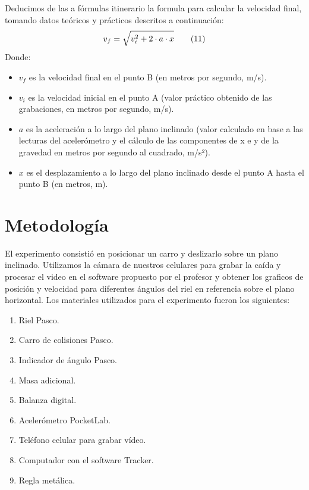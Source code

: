 \documentclass[twocolumn,12pt]{article}
\begin{document}
        Deducimos de las a fórmulas itinerario la formula para calcular la velocidad final, tomando datos teóricos y prácticos descritos a continuación:
        \vspace{0.8cm} 
	\begin{equation}
        \centering
	v_f = \sqrt{v_i^2 + 2 \cdot a \cdot x}\tag{11}
	\end{equation}
 	\vspace{-0.4cm} 
	Donde:
	\begin{itemize}
		\item \(v_f\) es la velocidad final en el punto B (en metros por segundo, m/s).
		\item \(v_i\) es la velocidad inicial en el punto A (valor práctico obtenido de las grabaciones, en metros por segundo, m/s).
		\item \(a\) es la aceleración a lo largo del plano inclinado (valor calculado en base a las lecturas del acelerómetro y el cálculo de las componentes de x e y de la gravedad en metros por segundo al cuadrado, m/s²).
		\item \(x\) es el desplazamiento a lo largo del plano inclinado desde el punto A hasta el punto B (en metros, m).
	\end{itemize}
	
	\section{Metodología}
	El experimento consistió en posicionar un carro y deslizarlo sobre un plano inclinado. Utilizamos la cámara de nuestros celulares para grabar la caída y procesar el video en el software propuesto por el profesor y obtener los graficos de posición y velocidad para diferentes ángulos del riel en referencia sobre el plano horizontal. Los materiales utilizados para el experimento fueron los siguientes:
	
	\begin{enumerate}
	\item Riel Pasco.
	\item Carro de colisiones Pasco.
	\item Indicador de ángulo Pasco.
	\item Masa adicional.
	\item Balanza digital.
	\item Acelerómetro PocketLab.
	\item Teléfono celular para grabar vídeo.
	\item Computador con el software Tracker. 
	\item Regla metálica.
	\end{enumerate}	
	
\end{document}
